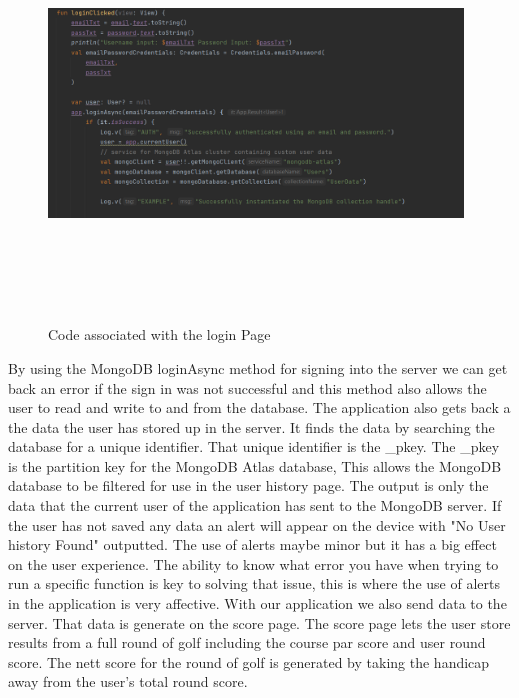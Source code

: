 \begin{figure}[H]
    \centering
    \includegraphics[width=11cm, height = 11cm]{img/mongoSignIn.PNG}
    \caption{Code associated with the login Page}
    \label{fig:altas config}
\end{figure}
By using the MongoDB loginAsync method for signing into the server we can get back an error if the sign in was not successful and this method also allows the user to read and write to and from the database.
\newline
The application also gets back a the data the user has stored up in the server. It finds the data by searching the database for a unique identifier. That unique identifier is the \_pkey. The \_pkey is the partition key for the MongoDB Atlas database, This allows the MongoDB database to be filtered for use in the user history page. The output is only the data that the current user of the application has sent to the MongoDB server. \newline
If the user has not saved any data an alert will appear on the device with "No User history Found" outputted. The use of alerts maybe minor but it has a big effect on the user experience. The ability to know what error you have when trying to run a specific function is key to solving that issue, this is where the use of alerts in the application is very affective.
\newpage
With our application we also send data to the server. That data is generate on the score page. The score page lets the user store results from a full round of golf including the course par score and user round score. The nett score for the round of golf is generated by taking the handicap away from the user's total round score. 
